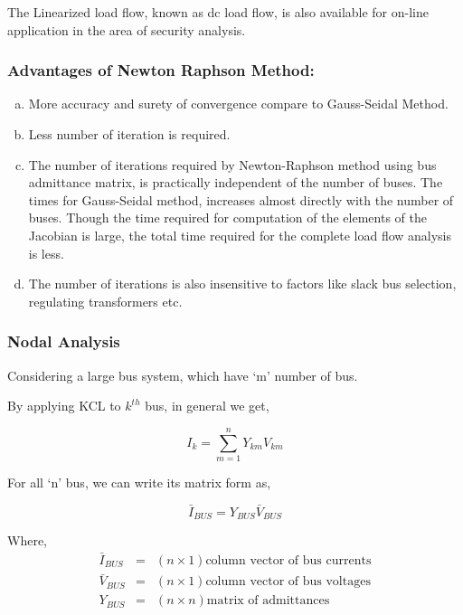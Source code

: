 \documentclass[a4paper,11pt]{article}
\begin{document}
The Linearized load flow, known as dc load flow, is also available for on-line
application in the area of security analysis.

\subsubsection{Advantages of Newton Raphson Method:}

\begin{enumerate}[a.]
\item More accuracy and surety of convergence compare to Gauss-Seidal Method.
\item Less number of iteration is required.
\item The number of iterations required by Newton-Raphson method using bus admittance matrix, is practically independent of the number of buses. The times for Gauss-Seidal method, increases almost directly with the number of buses. Though the time required for computation of the elements of the Jacobian is large, the total time required for the complete load flow analysis is less.
\item The number of iterations is also insensitive to factors like slack bus selection, regulating transformers etc.
\end{enumerate}

\subsubsection{Nodal Analysis}

Considering a large bus system, which have `m' number of bus.

By applying KCL to $k^{th}$ bus, in general we get,

\begin{equation}
I_{k} = \sum_{m=1}^{n} Y_{km}V_{km} 
\end{equation}

For all `n' bus, we can write its matrix form as,

\begin{equation}
\bar{I}_{BUS} = Y_{BUS}\bar{V}_{BUS} 
\end{equation}

Where,
\begin{eqnarray*}
\bar{I}_{BUS} & = & (n \times 1) \textrm{column vector of bus currents}\\
\bar{V}_{BUS} & = & (n \times 1) \textrm{column vector of bus voltages}\\
Y_{BUS} & = & (n \times n) \textrm{matrix of admittances}
\end{eqnarray*}
\end{document}
